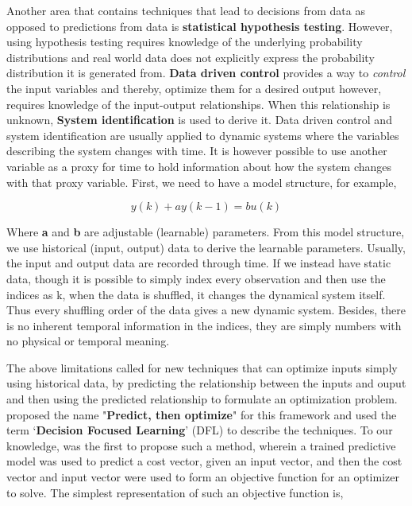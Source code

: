 \documentclass[12pt, letterpaper]{article}
\begin{document}
Another area that contains techniques that lead to decisions from data as
opposed to predictions from data is \textbf{statistical hypothesis testing}.
However, using hypothesis testing requires knowledge of the underlying
probability distributions and real world data does not explicitly express the
probability distribution it is generated from. \textbf{Data driven control}
provides a way to \textit{control} the input variables and thereby, optimize
them for a desired output however, requires knowledge of the input-output
relationships. When this relationship is unknown, \textbf{System identification}
is used to derive it. Data driven control and system identification are usually
applied to dynamic systems where the variables describing the system changes
with time. It is however possible to use another variable as a proxy for time to
hold information about how the system changes with that proxy variable. First,
we need to have a model structure, for example,

\begin{equation}
    y(k) + ay(k-1) = bu(k)
\end{equation}

Where \textbf{a} and \textbf{b} are adjustable (learnable) parameters. From this
model structure, we use historical (input, output) data to derive the learnable
parameters. Usually, the input and output data are recorded through time. If
we instead have static data, though it is possible to simply index every observation
and then use the indices as k, when the data is shuffled, it changes the dynamical 
system itself. Thus every shuffling order of the data gives a new dynamic system.
Besides, there is no inherent temporal information in the indices, they are simply
numbers with no physical or temporal meaning.

The above limitations called for new techniques that can optimize inputs simply
using historical data, by predicting the relationship between the inputs and
ouput and then using the predicted relationship to formulate an optimization
problem. \cite{Mandi_2024} proposed the name "\textbf{Predict, then optimize}"
for this framework and used the term `\textbf{Decision Focused Learning}' (DFL) to
describe the techniques. To our knowledge, \cite{spo} was the first to propose
such a method, wherein a trained predictive model was used to predict a cost
vector, given an input vector, and then the cost vector and input vector were
used to form an objective function for an optimizer to solve. The simplest
representation of such an objective function is,
\end{document}
